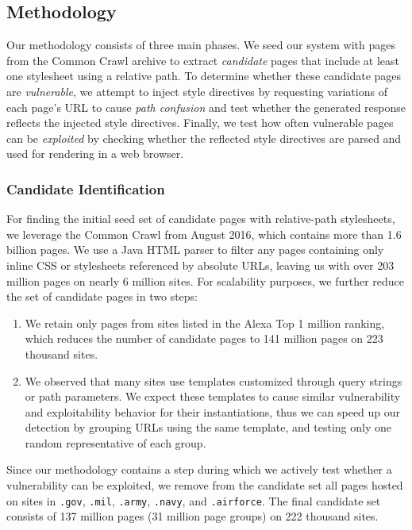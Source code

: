 \subsection{Methodology}
\label{rpo:sec:methodology}

Our methodology consists of three main phases. We seed our system with pages
from the Common Crawl archive to extract \textit{candidate} pages that include
at least one stylesheet using a relative path. To determine whether these
candidate pages are \textit{vulnerable}, we attempt to inject style directives
by requesting variations of each page's URL to cause \textit{path confusion} and
test whether the generated response reflects the injected style directives.
Finally, we test how often vulnerable pages can be \textit{exploited} by
checking whether the reflected style directives are parsed and used for
rendering in a web browser.

\subsubsection{Candidate Identification}
\label{rpo:sec:methodology:candidate}

For finding the initial seed set of candidate pages with relative-path
stylesheets, we leverage the Common Crawl from August 2016, which contains more
than 1.6 billion pages. We use a Java HTML parser to filter any pages containing
only inline CSS or stylesheets referenced by absolute URLs, leaving us with over
203 million pages on nearly 6 million sites. For scalability purposes, we
further reduce the set of candidate pages in two steps:

\begin{enumerate}

\item We retain only pages from sites listed in the Alexa Top 1 million ranking,
which reduces the number of candidate pages to 141 million pages on 223 thousand
sites.

\item We observed that many sites use templates customized through query strings
or path parameters. We expect these templates to cause similar vulnerability and
exploitability behavior for their instantiations, thus we can speed up our
detection by grouping URLs using the same template, and testing only one random
representative of each group.

\end{enumerate}

Since our methodology contains a step during which we actively test whether a
vulnerability can be exploited, we remove from the candidate set all pages
hosted on sites in \texttt{.gov}, \texttt{.mil}, \texttt{.army}, \texttt{.navy},
and \texttt{.airforce}. The final candidate set consists of 137 million pages
(31 million page groups) on 222 thousand sites.

